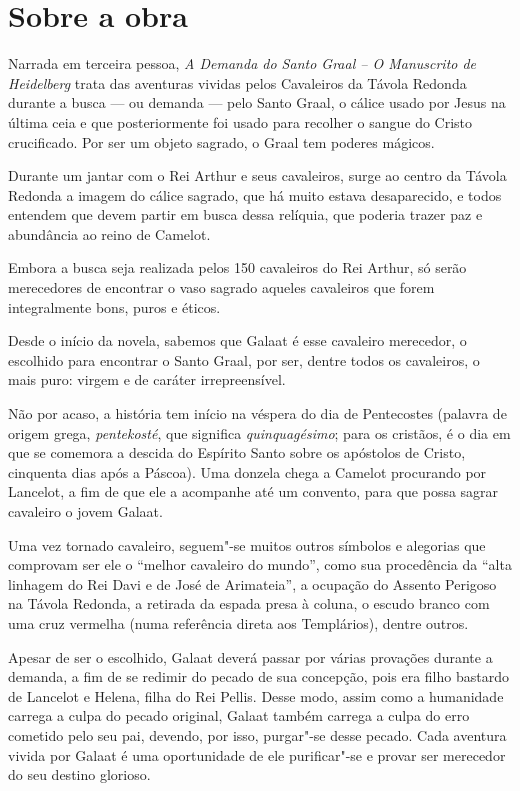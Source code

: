 \section{Sobre a obra}

Narrada em terceira pessoa, \emph{A Demanda do Santo Graal -- O
Manuscrito de Heidelberg} trata das aventuras vividas pelos
Cavaleiros da Távola Redonda durante a busca --- ou demanda ---
pelo Santo Graal, o cálice usado por Jesus na última ceia e que
posteriormente foi usado para recolher o sangue do Cristo crucificado.
Por ser um objeto sagrado, o Graal tem poderes mágicos.

Durante um jantar com o Rei Arthur e seus cavaleiros, surge ao centro da
Távola Redonda a imagem do cálice sagrado, que há muito estava
desaparecido, e todos entendem que devem partir em busca dessa relíquia,
que poderia trazer paz e abundância ao reino de Camelot.

Embora a busca seja realizada pelos 150 cavaleiros do Rei Arthur, só
serão merecedores de encontrar o vaso sagrado aqueles cavaleiros que
forem integralmente bons, puros e éticos.

Desde o início da novela, sabemos que Galaat é esse cavaleiro merecedor,
o escolhido para
encontrar o Santo Graal, por ser, dentre todos os cavaleiros, o mais
puro: virgem e de caráter irrepreensível.

Não por acaso, a história tem início na véspera
do dia de Pentecostes (palavra de origem grega, \emph{pentekosté}, que
significa \emph{quinquagésimo}; para os cristãos, é o dia em que se
comemora a descida do Espírito Santo sobre os apóstolos de Cristo,
cinquenta dias após a Páscoa). Uma donzela chega a Camelot procurando
por Lancelot, a fim de que ele a acompanhe até um convento, para que
possa sagrar cavaleiro o jovem Galaat.

Uma vez tornado cavaleiro, seguem"-se muitos outros símbolos e
alegorias que comprovam ser ele o ``melhor cavaleiro do mundo'', como
sua procedência da ``alta linhagem do Rei Davi e de José de Arimateia'',
a ocupação do Assento Perigoso na Távola Redonda, a retirada da espada
presa à coluna, o escudo branco com uma cruz vermelha (numa referência
direta aos Templários), dentre outros.

Apesar de ser o escolhido, Galaat deverá passar por várias
provações durante a demanda, a fim de se redimir do pecado de sua
concepção, pois era filho bastardo de Lancelot e Helena, filha do Rei
Pellis. Desse modo, assim como a humanidade carrega a culpa do pecado
original, Galaat também carrega a culpa do erro cometido pelo seu pai,
devendo, por isso, purgar"-se desse pecado. Cada aventura vivida por
Galaat é uma oportunidade de ele purificar"-se e provar ser merecedor do
seu destino glorioso.

